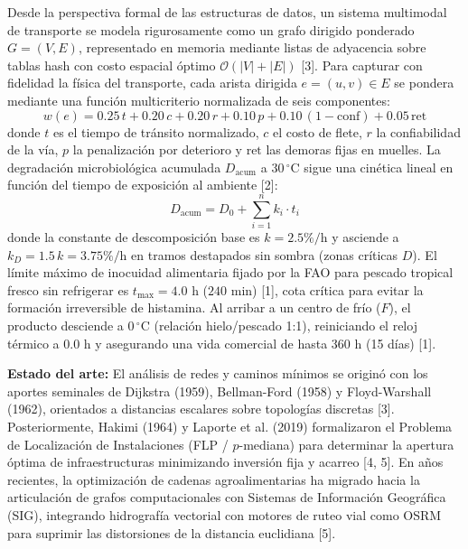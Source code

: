 \documentclass[10pt,twocolumn,a4paper]{article}
\begin{document}
Desde la perspectiva formal de las estructuras de datos, un sistema multimodal de transporte se modela rigurosamente como un grafo dirigido ponderado $G = (V, E)$, representado en memoria mediante listas de adyacencia sobre tablas hash con costo espacial óptimo $\mathcal{O}(|V| + |E|)$ [3]. Para capturar con fidelidad la física del transporte, cada arista dirigida $e = (u, v) \in E$ se pondera mediante una función multicriterio normalizada de seis componentes:
\begin{equation}
    w(e) = 0.25\,t + 0.20\,c + 0.20\,r + 0.10\,p + 0.10\,(1-\text{conf}) + 0.05\,\text{ret}
\end{equation}
donde $t$ es el tiempo de tránsito normalizado, $c$ el costo de flete, $r$ la confiabilidad de la vía, $p$ la penalización por deterioro y $\text{ret}$ las demoras fijas en muelles. La degradación microbiológica acumulada $D_{\text{acum}}$ a $30\,^\circ\text{C}$ sigue una cinética lineal en función del tiempo de exposición al ambiente [2]:
\begin{equation}
    D_{\text{acum}} = D_0 + \sum_{i=1}^n k_i \cdot t_i
\end{equation}
donde la constante de descomposición base es $k = 2.5\%\text{/h}$ y asciende a $k_D = 1.5\,k = 3.75\%\text{/h}$ en tramos destapados sin sombra (zonas críticas $D$). El límite máximo de inocuidad alimentaria fijado por la FAO para pescado tropical fresco sin refrigerar es $t_{\max} = 4.0\text{ h}$ ($240\text{ min}$) [1], cota crítica para evitar la formación irreversible de histamina. Al arribar a un centro de frío ($F$), el producto desciende a $0\,^\circ\text{C}$ (relación hielo/pescado 1:1), reiniciando el reloj térmico a $0.0\text{ h}$ y asegurando una vida comercial de hasta $360\text{ h}$ (15 días) [1].

\textbf{Estado del arte:} El análisis de redes y caminos mínimos se originó con los aportes seminales de Dijkstra (1959), Bellman-Ford (1958) y Floyd-Warshall (1962), orientados a distancias escalares sobre topologías discretas [3]. Posteriormente, Hakimi (1964) y Laporte et al. (2019) formalizaron el Problema de Localización de Instalaciones (FLP / $p$-mediana) para determinar la apertura óptima de infraestructuras minimizando inversión fija y acarreo [4, 5]. En años recientes, la optimización de cadenas agroalimentarias ha migrado hacia la articulación de grafos computacionales con Sistemas de Información Geográfica (SIG), integrando hidrografía vectorial con motores de ruteo vial como OSRM para suprimir las distorsiones de la distancia euclidiana [5].
\end{document}
